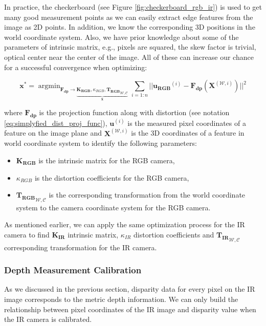 \documentclass[12pt]{report}
\numberwithin{figure}{section}
\newcommand{\argmin}{\mathop{\mathrm{argmin}}}
\begin{document}
In practice, the checkerboard (see Figure \ref{fig:checkerboard_rgb_ir}) 
is 
used to get many good measurement points as 
we can easily extract edge features from the image as 2D points.  In addition, 
we know the corresponding 3D positions in the world coordinate system.
Also, we have prior knowledge about some of the parameters of intrinsic 
matrix, e.g., pixels are squared, the skew factor is trivial, optical center 
near 
the center of the image. All of these can increase our chance for a successful 
convergence when optimizing:

\begin{equation}\label{eq:proj_lsq}
  \mathbf{x^*}
  = 
  \argmin_{\mathbf{F_{dp}} \rightarrow 
  	\underbrace{
  		\mathbf{K_{RGB}}, 
  \kappa_{RGB}, 
  {\mathbf{T_{RGB}}}_{\mathcal{W}, \mathcal{C}}
  }_{\mathbf{x}}
  }
  \sum_{i=1:n} || \mathbf{u_{RGB}}^{(i)} - 
  \mathbf{F_{dp}} (\mathbf{X}^{(\mathcal{W}, i)}) ||^2
\end{equation}

where $\mathbf{F_{dp}}$ is the projection function along with distortion (see 
notation \eqref{eq:simplyfied_dist_proj_func}), $\mathbf{u}^{(i)}$ is the 
measured pixel coordinates of a feature on the image plane and 
$\mathbf{X}^{(\mathcal{W},i)}$ is the 3D coordinates of a feature in world 
coordinate 
system to identify the following parameters:

\begin{itemize}
  \item $\mathbf{K_{RGB}}$ is the intrinsic matrix for the RGB camera, 
  \item $\kappa_{RGB}$ is the distortion coefficients for the RGB camera, 
  \item ${\mathbf{T_{RGB}}}_{\mathcal{W}, \mathcal{C}}$ is the corresponding 
  transformation from the world coordinate system to the camera coordinate 
  system for the RGB camera.
\end{itemize}

As mentioned earlier, we can apply the same optimization process for the IR 
camera 
to find $\mathbf{K_{IR}}$ intrinsic matrix, $\kappa_{IR}$ 
distortion coefficients and ${\mathbf{T_{IR}}}_{\mathcal{W}, 
	\mathcal{C}}$ corresponding transformation for the IR camera.


\subsubsection{Depth Measurement Calibration}

As we discussed in the previous section, disparity data for every pixel on the 
IR 
image corresponds to the metric depth information.  We can only build the 
relationship between pixel coordinates of the IR image and disparity value 
when the IR camera is calibrated.
\end{document}
